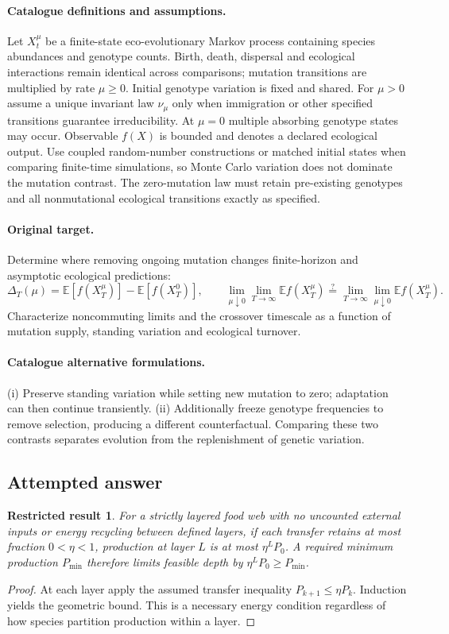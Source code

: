 \documentclass[11pt]{article}
\newcommand{\E}{\mathbb E}
\providecommand{\E}{\mathbb E}
\newtheorem{attemptresult}{Restricted result}[section]
\begin{document}
\paragraph{Catalogue definitions and assumptions.}
Let $X_t^\mu$ be a finite-state eco-evolutionary Markov process containing species abundances and genotype counts. Birth, death, dispersal and ecological interactions remain identical across comparisons; mutation transitions are multiplied by rate $\mu\ge0$. Initial genotype variation is fixed and shared. For $\mu>0$ assume a unique invariant law $\nu_\mu$ only when immigration or other specified transitions guarantee irreducibility. At $\mu=0$ multiple absorbing genotype states may occur. Observable $f(X)$ is bounded and denotes a declared ecological output. Use coupled random-number constructions or matched initial states when comparing finite-time simulations, so Monte Carlo variation does not dominate the mutation contrast. The zero-mutation law must retain pre-existing genotypes and all nonmutational ecological transitions exactly as specified.
\paragraph{Original target.}
Determine where removing ongoing mutation changes finite-horizon and asymptotic ecological predictions:
\[
 \Delta_T(\mu)=\E[f(X_T^\mu)]-\E[f(X_T^0)],
 \qquad
 \lim_{\mu\downarrow0}\lim_{T\to\infty}\E f(X_T^\mu)
 \stackrel{?}{=}
 \lim_{T\to\infty}\lim_{\mu\downarrow0}\E f(X_T^\mu).
\]
Characterize noncommuting limits and the crossover timescale as a function of mutation supply, standing variation and ecological turnover.
\paragraph{Catalogue alternative formulations.}
(i) Preserve standing variation while setting new mutation to zero; adaptation can then continue transiently. (ii) Additionally freeze genotype frequencies to remove selection, producing a different counterfactual. Comparing these two contrasts separates evolution from the replenishment of genetic variation.
\subsection{Attempted answer}
\begin{attemptresult}
For a strictly layered food web with no uncounted external inputs or energy recycling between defined layers, if each transfer retains at most fraction $0<\eta<1$, production at layer $L$ is at most $\eta^LP_0$. A required minimum production $P_{\min}$ therefore limits feasible depth by $\eta^LP_0\geq P_{\min}$.
\end{attemptresult}
\begin{proof}
At each layer apply the assumed transfer inequality $P_{k+1}\leq\eta P_k$. Induction yields the geometric bound. This is a necessary energy condition regardless of how species partition production within a layer.
\end{proof}
\end{document}

